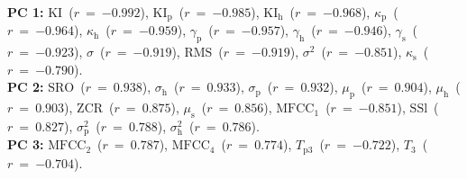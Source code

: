 {\bf{PC 1:}} $\mathrm{KI}$~($r~=~{-0.992}$), $\mathrm{KI_{p}}$~($r~=~{-0.985}$), $\mathrm{KI_{h}}$~($r~=~{-0.968}$), $\kappa_{\mathrm{p}}$~($r~=~{-0.964}$), $\kappa_{\mathrm{h}}$~($r~=~{-0.959}$), $\gamma_{\mathrm{p}}$~($r~=~{-0.957}$), $\gamma_{\mathrm{h}}$~($r~=~{-0.946}$), $\gamma_{\mathrm{s}}$~($r~=~{-0.923}$), $\sigma$~($r~=~{-0.919}$), $\mathrm{RMS}$~($r~=~{-0.919}$), $\sigma^{2}$~($r~=~{-0.851}$), $\kappa_{\mathrm{s}}$~($r~=~{-0.790}$).\vspace{0.5em}\\
{\bf{PC 2:}} $\mathrm{SRO}$~($r~=~{ 0.938}$), $\sigma_{\mathrm{h}}$~($r~=~{ 0.933}$), $\sigma_{\mathrm{p}}$~($r~=~{ 0.932}$), $\mu_{\mathrm{p}}$~($r~=~{ 0.904}$), $\mu_{\mathrm{h}}$~($r~=~{ 0.903}$), $\mathrm{ZCR}$~($r~=~{ 0.875}$), $\mu_{\mathrm{s}}$~($r~=~{ 0.856}$), $\mathrm{MFCC}_{1}$~($r~=~{-0.851}$), $\mathrm{SSl}$~($r~=~{ 0.827}$), $\sigma_{\mathrm{p}}^{2}$~($r~=~{ 0.788}$), $\sigma_{\mathrm{h}}^{2}$~($r~=~{ 0.786}$).\vspace{0.5em}\\
{\bf{PC 3:}} $\mathrm{MFCC}_{2}$~($r~=~{ 0.787}$), $\mathrm{MFCC}_{4}$~($r~=~{ 0.774}$), $T_{\mathrm{p}3}$~($r~=~{-0.722}$), $T_{3}$~($r~=~{-0.704}$).
